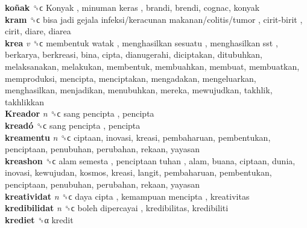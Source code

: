 \textbf{koñak} ␝ϲ   Konyak ,  minuman keras , brandi, brendi, cognac, konyak  \\
\textbf{kram} ␝ϲ   bisa jadi gejala infeksi/keracunan makanan/colitis/tumor ,  cirit-birit , cirit, diare, diarea  \\
\textbf{krea} \emph{v}  ␝ϲ   membentuk watak ,  menghasilkan sesuatu ,  menghasilkan sst , berkarya, berkreasi, bina, cipta, dianugerahi, diciptakan, ditubuhkan, melaksanakan, melakukan, membentuk, membuahkan, membuat, membuatkan, memproduksi, mencipta, menciptakan, mengadakan, mengeluarkan, menghasilkan, menjadikan, menubuhkan, mereka, mewujudkan, takhlik, takhlikkan  \\
\textbf{Kreador} \emph{n}  ␝ϲ   sang pencipta , pencipta  \\
\textbf{kreadó} ␝ϲ   sang pencipta , pencipta  \\
\textbf{kreamentu} \emph{n}  ␝ϲ  ciptaan, inovasi, kreasi, pembaharuan, pembentukan, penciptaan, penubuhan, perubahan, rekaan, yayasan  \\
\textbf{kreashon} ␝ϲ   alam semesta ,  penciptaan tuhan , alam, buana, ciptaan, dunia, inovasi, kewujudan, kosmos, kreasi, langit, pembaharuan, pembentukan, penciptaan, penubuhan, perubahan, rekaan, yayasan  \\
\textbf{kreatividat} \emph{n}  ␝ϲ   daya cipta ,  kemampuan mencipta , kreativitas  \\
\textbf{kredibilidat} \emph{n}  ␝ϲ   boleh dipercayai , kredibilitas, kredibiliti  \\
\textbf{krediet} ␝α  kredit  \\
